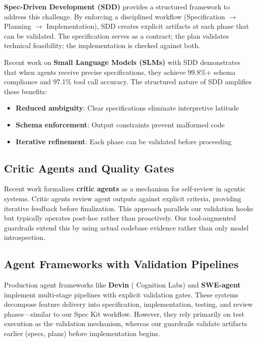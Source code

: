 \documentclass[sigconf,anonymous,review]{acmart}
\begin{document}
\textbf{Spec-Driven Development (SDD)} provides a structured framework to address this challenge. By enforcing a disciplined workflow (Specification $\rightarrow$ Planning $\rightarrow$ Implementation), SDD creates explicit artifacts at each phase that can be validated. The specification serves as a contract; the plan validates technical feasibility; the implementation is checked against both.

Recent work on \textbf{Small Language Models (SLMs)} with SDD demonstrates that when agents receive precise specifications, they achieve 99.8\%+ schema compliance and 97.1\% tool call accuracy. The structured nature of SDD amplifies these benefits:

\begin{itemize}
  \item \textbf{Reduced ambiguity}: Clear specifications eliminate interpretive latitude
  \item \textbf{Schema enforcement}: Output constraints prevent malformed code
  \item \textbf{Iterative refinement}: Each phase can be validated before proceeding
\end{itemize}

\subsection{Critic Agents and Quality Gates}

Recent work formalizes \textbf{critic agents} as a mechanism for self-review in agentic systems. Critic agents review agent outputs against explicit criteria, providing iterative feedback before finalization. This approach parallels our validation hooks but typically operates post-hoc rather than proactively. Our tool-augmented guardrails extend this by using actual codebase evidence rather than only model introspection.

\subsection{Agent Frameworks with Validation Pipelines}

Production agent frameworks like \textbf{Devin} ( Cognition Labs) and \textbf{SWE-agent} implement multi-stage pipelines with explicit validation gates. These systems decompose feature delivery into specification, implementation, testing, and review phases---similar to our Spec Kit workflow. However, they rely primarily on test execution as the validation mechanism, whereas our guardrails validate artifacts earlier (specs, plans) before implementation begins.
\end{document}
